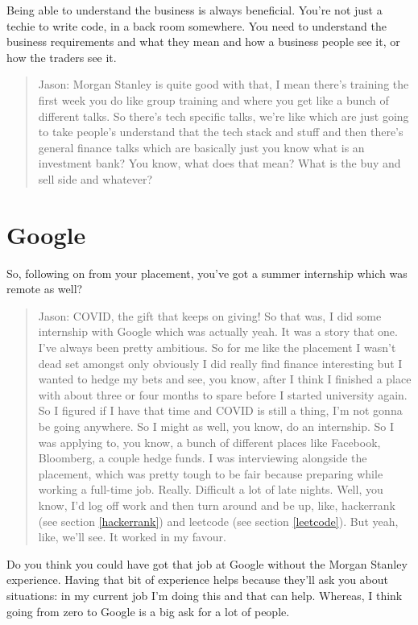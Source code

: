 \documentclass[
]{book}
\begin{document}
Being able to understand the business is always beneficial. You're not just a techie to write code, in a back room somewhere. You need to understand the business requirements and what they mean and how a business people see it, or how the traders see it.

\begin{quote}
Jason: Morgan Stanley is quite good with that, I mean there's training the first week you do like group training and where you get like a bunch of different talks. So there's tech specific talks, we're like which are just going to take people's understand that the tech stack and stuff and then there's general finance talks which are basically just you know what is an investment bank? You know, what does that mean? What is the buy and sell side and whatever?
\end{quote}

\hypertarget{jgoogle}{%
\section{Google}\label{jgoogle}}

So, following on from your placement, you've got a summer internship which was remote as well?

\begin{quote}
Jason: COVID, the gift that keeps on giving! So that was, I did some internship with Google which was actually yeah. It was a story that one. I've always been pretty ambitious. So for me like the placement I wasn't dead set amongst only obviously I did really find finance interesting but I wanted to hedge my bets and see, you know, after I think I finished a place with about three or four months to spare before I started university again. So I figured if I have that time and COVID is still a thing, I'm not gonna be going anywhere. So I might as well, you know, do an internship. So I was applying to, you know, a bunch of different places like Facebook, Bloomberg, a couple hedge funds. I was interviewing alongside the placement, which was pretty tough to be fair because preparing while working a full-time job. Really. Difficult a lot of late nights. Well, you know, I'd log off work and then turn around and be up, like, hackerrank (see section \ref{hackerrank}) and leetcode (see section \ref{leetcode}). But yeah, like, we'll see. It worked in my favour.
\end{quote}

Do you think you could have got that job at Google without the Morgan Stanley experience. Having that bit of experience helps because they'll ask you about situations: in my current job I'm doing this and that can help. Whereas, I think going from zero to Google is a big ask for a lot of people.
\end{document}

